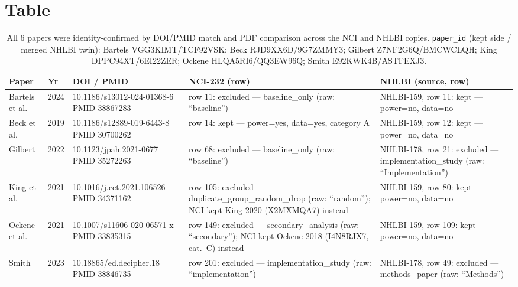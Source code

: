 \documentclass[11pt]{article}
\begin{document}
\newpage
\section{Table}

\begin{table}[h]
\centering
\small
\begin{tabular}{p{1cm}p{0.5cm}p{2.6cm}p{4.7cm}p{4.9cm}}
\toprule
Paper & Yr & DOI / PMID & NCI-232 (row) & NHLBI (source, row) \\
\midrule
Bartels et al. & 2024 &
10.1186/s13012-024-01368-6 \newline PMID 38867283 &
row 11: excluded --- baseline\_only (raw: ``baseline'') &
NHLBI-159, row 11: kept --- power=no, data=no \\
\addlinespace
Beck et al. & 2019 &
10.1186/s12889-019-6443-8 \newline PMID 30700262 &
row 14: kept --- power=yes, data=yes, category A &
NHLBI-159, row 12: kept --- power=no, data=no \\
\addlinespace
Gilbert & 2022 &
10.1123/jpah.2021-0677 \newline PMID 35272263 &
row 68: excluded --- baseline\_only (raw: ``baseline'') &
NHLBI-178, row 21: excluded --- implementation\_study (raw: ``Implementation'') \\
\addlinespace
King et al. & 2021 &
10.1016/\newline j.cct.2021.106526 \newline PMID 34371162 &
row 105: excluded --- duplicate\_group\_random\_drop (raw: ``random''); NCI kept King 2020
(X2MXMQA7) instead &
NHLBI-159, row 80: kept --- power=no, data=no \\
\addlinespace
Ockene et al. & 2021 &
10.1007/s11606-020-06571-x \newline PMID 33835315 &
row 149: excluded --- secondary\_analysis (raw: ``secondary''); NCI kept Ockene 2018
(I4N8RJX7, cat.\ C) instead &
NHLBI-159, row 109: kept --- power=no, data=no \\
\addlinespace
Smith & 2023 &
10.18865/\newline ed.decipher.18 \newline PMID 38846735 &
row 201: excluded --- implementation\_study (raw: ``implementation'') &
NHLBI-178, row 49: excluded --- methods\_paper (raw: ``Methods'') \\
\bottomrule
\end{tabular}
\caption{All 6 papers were identity-confirmed by DOI/PMID match and PDF comparison across the
NCI and NHLBI copies. \texttt{paper\_id} (kept side / merged NHLBI twin): Bartels
VGG3KIMT/TCF92VSK; Beck RJD9XX6D/9G7ZMMY3; Gilbert Z7NF2G6Q/BMCWCLQH; King
DPPC94XT/6EI22ZER; Ockene HLQA5RI6/QQ3EW96Q; Smith E92KWK4B/ASTFEXJ3.}
\end{table}
\end{document}
